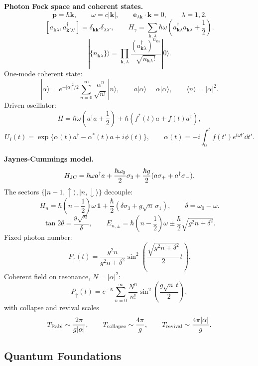 \noindent\textbf{Photon Fock space and coherent states.}\quad
\[
\mathbf p=\hbar\mathbf k,\qquad \omega=c|\mathbf k|,\qquad
\mathbf e_{\lambda\mathbf k}\cdot\mathbf k=0,\qquad \lambda=1,2.
\]
\[
[a_{\mathbf k\lambda},a_{\mathbf k'\lambda'}^\dagger]
=\delta_{\mathbf k\mathbf k'}\delta_{\lambda\lambda'},\qquad
H_\gamma=\sum_{\mathbf k,\lambda}\hbar\omega
\left(a_{\mathbf k\lambda}^\dagger a_{\mathbf k\lambda}+\frac12\right).
\]
\[
|\{n_{\mathbf k\lambda}\}\rangle=
\prod_{\mathbf k,\lambda}\frac{(a_{\mathbf k\lambda}^\dagger)^{n_{\mathbf k\lambda}}}
{\sqrt{n_{\mathbf k\lambda}!}}|0\rangle.
\]
One-mode coherent state:
\[
|\alpha\rangle=e^{-|\alpha|^2/2}\sum_{n=0}^\infty
\frac{\alpha^n}{\sqrt{n!}}|n\rangle,\qquad
a|\alpha\rangle=\alpha|\alpha\rangle,\qquad
\langle n\rangle=|\alpha|^2.
\]
Driven oscillator:
\[
H=\hbar\omega\left(a^\dagger a+\frac12\right)
+\hbar(f^*(t)a+f(t)a^\dagger),
\]
\[
U_I(t)=\exp\{\alpha(t)a^\dagger-\alpha^*(t)a+i\phi(t)\},\qquad
\alpha(t)=-i\int_0^tf(t')e^{i\omega t'}\dd t'.
\]

\noindent\textbf{Jaynes-Cummings model.}\quad
\[
H_{\rm JC}=\hbar\omega a^\dagger a+\frac{\hbar\omega_0}{2}\sigma_3
+\frac{\hbar g}{2}(a\sigma_+ +a^\dagger\sigma_-).
\]
The sectors $\{|n-1,\uparrow\rangle,|n,\downarrow\rangle\}$ decouple:
\[
H_n=\hbar\left(n-\frac12\right)\omega\,\mathbf{1}
+\frac{\hbar}{2}\left(\delta\sigma_3+g\sqrt n\,\sigma_1\right),
\qquad \delta=\omega_0-\omega.
\]
\[
\tan2\theta=\frac{g\sqrt n}{\delta},\qquad
E_{n,\pm}=\hbar\left(n-\frac12\right)\omega
\pm\frac{\hbar}{2}\sqrt{g^2n+\delta^2}.
\]
Fixed photon number:
\[
P_\uparrow(t)=\frac{g^2n}{g^2n+\delta^2}
\sin^2\left(\frac{\sqrt{g^2n+\delta^2}}{2}t\right).
\]
Coherent field on resonance, $N=|\alpha|^2$:
\[
P_\uparrow(t)=e^{-N}\sum_{n=0}^\infty\frac{N^n}{n!}
\sin^2\left(\frac{g\sqrt n\,t}{2}\right),
\]
with collapse and revival scales
\[
T_{\rm Rabi}\sim\frac{2\pi}{g|\alpha|},\qquad
T_{\rm collapse}\sim\frac{4\pi}{g},\qquad
T_{\rm revival}\sim\frac{4\pi|\alpha|}{g}.
\]

\subsection{Quantum Foundations}

